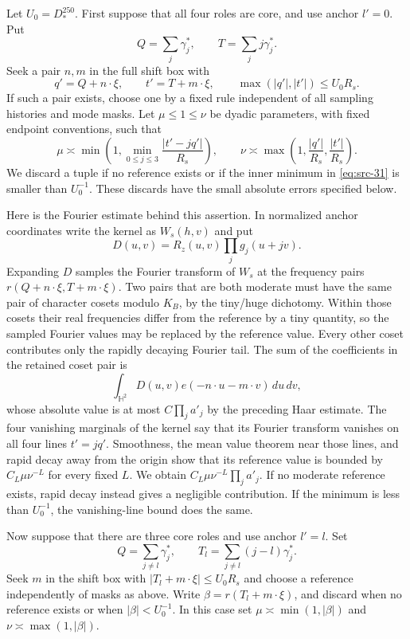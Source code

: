 Let $U_0=D_*^{250}$.  First suppose that all four roles are core, and
use anchor $l'=0$.  Put
\[
 Q=\sum_j\gamma_j^*,\qquad T=\sum_j j\gamma_j^*.
\]
Seek a pair $n,m$ in the full shift box with
\[
 q'=Q+n\cdot\xi,\qquad t'=T+m\cdot\xi,
 \qquad \max(|q'|,|t'|)\leq U_0R_s.
\]
If such a pair exists, choose one by a fixed rule independent of all
sampling histories and mode masks.  Let $\mu\leq1\leq\nu$ be dyadic
parameters, with fixed endpoint conventions, such that
\begin{equation*}
 \mu\asymp\min\left(1,\min_{0\leq j\leq3}
                   \frac{|t'-jq'|}{R_s}\right),
 \qquad
 \nu\asymp\max\left(1,\frac{|q'|}{R_s},
                           \frac{|t'|}{R_s}\right).
 \tag{31}\label{eq:src-31}
\end{equation*}
We discard a tuple if no reference exists or if the inner minimum in
\eqref{eq:src-31} is smaller than $U_0^{-1}$.  These discards have the
small absolute errors specified below.

Here is the Fourier estimate behind this assertion.  In normalized
anchor coordinates write the kernel as $W_s(h,v)$ and put
\[
 D(u,v)=R_z(u,v)\prod_jg_j(u+jv).
\]
Expanding $D$ samples the Fourier transform of $W_s$ at the frequency
pairs $r(Q+n\cdot\xi,T+m\cdot\xi)$.  Two pairs that are both moderate
must have the same pair of character cosets modulo $K_B$, by the
tiny/huge dichotomy.  Within those cosets their real frequencies differ
from the reference by a tiny quantity, so the sampled Fourier values
may be replaced by the reference value.  Every other coset contributes
only the rapidly decaying Fourier tail.  The sum of the coefficients
in the retained coset pair is
\[
 \int_{\mathbb H^2}D(u,v)e(-n\cdot u-m\cdot v)\,du\,dv,
\]
whose absolute value is at most $C\prod_ja'_j$ by the preceding Haar
estimate.  The four vanishing marginals of the kernel say that its
Fourier transform vanishes on all four lines $t'=jq'$.  Smoothness,
the mean value theorem near those lines, and rapid decay away from
the origin show that its reference value is bounded by
$C_L\mu\nu^{-L}$ for every fixed $L$.  We obtain
$C_L\mu\nu^{-L}\prod_ja'_j$.  If no moderate reference exists, rapid
decay instead gives a negligible contribution.  If the minimum is
less than $U_0^{-1}$, the vanishing-line bound does the same.

Now suppose that there are three core roles and use anchor $l'=l$.
Set
\[
 Q=\sum_{j\ne l}\gamma_j^*,\qquad
 T_l=\sum_{j\ne l}(j-l)\gamma_j^*.
\]
Seek $m$ in the shift box with $|T_l+m\cdot\xi|\leq U_0R_s$ and choose
a reference independently of masks as above.  Write
$\beta=r(T_l+m\cdot\xi)$, and discard when no reference exists or when
$|\beta|<U_0^{-1}$.  In this case set
$\mu\asymp\min(1,|\beta|)$ and
$\nu\asymp\max(1,|\beta|)$.

